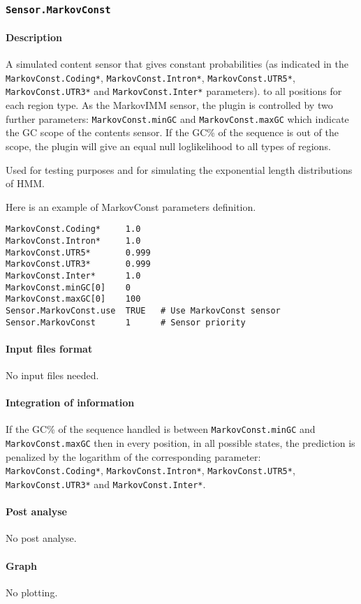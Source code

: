 
\subsubsection{\texttt{Sensor.MarkovConst}}

\paragraph{Description}

A simulated content sensor that gives constant probabilities (as
indicated in the \texttt{MarkovConst\-.Coding*},
\texttt{MarkovConst.Intron*}, \texttt{MarkovConst.UTR5*},
\texttt{MarkovConst.UTR3*} and \texttt{Markov\-Const.Inter*} parameters).
to all positions for each region type. As the MarkovIMM sensor, the
plugin is controlled by two further parameters:
\texttt{MarkovConst.minGC} and \texttt{MarkovConst.maxGC} which
indicate the GC scope of the contents sensor. If the GC\% of the
sequence is out of the scope, the plugin will give an equal null
loglikelihood to all types of regions.

Used for testing purposes and for simulating the exponential length
distributions of HMM.

Here is an example of MarkovConst parameters definition.
\begin{Verbatim}[fontsize=\small]
MarkovConst.Coding*     1.0
MarkovConst.Intron*     1.0
MarkovConst.UTR5*       0.999
MarkovConst.UTR3*       0.999
MarkovConst.Inter*      1.0
MarkovConst.minGC[0]    0
MarkovConst.maxGC[0]    100
Sensor.MarkovConst.use  TRUE   # Use MarkovConst sensor
Sensor.MarkovConst      1      # Sensor priority
\end{Verbatim}

\paragraph{Input files format}

No input files  needed.

\paragraph{Integration of information}

If the GC\% of the sequence handled is between
\texttt{MarkovConst.minGC} and \texttt{MarkovConst.maxGC} then in
every position, in all possible states, the prediction is penalized by
the logarithm of the corresponding parameter:
\texttt{MarkovConst.Coding*}, \texttt{MarkovConst.Intron*},
\texttt{MarkovConst.UTR5*}, \texttt{MarkovConst.UTR3*} and
\texttt{MarkovConst.Inter*}.

\paragraph{Post analyse}

No post analyse.

\paragraph{Graph}

No plotting.

